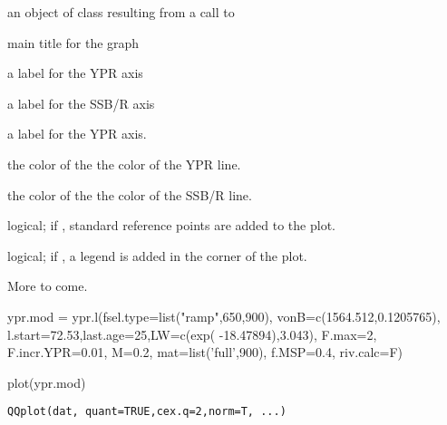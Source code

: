 \documentclass[a4paper]{book}
\begin{document}
\begin{Arguments}
\begin{ldescription}
\item[\code{object}] an object of class  resulting from a
call to 

\item[\code{main}] main title for the graph

\item[\code{ylab.ypr}] a label for the YPR  axis

\item[\code{ylab.ssb}] a label for the SSB/R  axis

\item[\code{xlab}] a label for the YPR  axis.

\item[\code{col.ypr}] the color of the the color of the YPR line.

\item[\code{col.ssb}] the color of the the color of the SSB/R line.

\item[\code{ref}] logical; if , standard reference points are added to the plot.

\item[\code{legend}] logical; if , a legend is added in the  corner of the plot.

\end{ldescription}
\end{Arguments}
%
\begin{Details}\relax
More to come.
\end{Details}
%
\begin{SeeAlso}\relax
{}
\end{SeeAlso}
%
\begin{Examples}
\begin{ExampleCode}
ypr.mod = ypr.l(fsel.type=list("ramp",650,900), vonB=c(1564.512,0.1205765), 
                l.start=72.53,last.age=25,LW=c(exp( -18.47894),3.043), F.max=2,
                F.incr.YPR=0.01, M=0.2, mat=list('full',900), f.MSP=0.4, riv.calc=F)  

plot(ypr.mod)

\end{ExampleCode}
\end{Examples}
\newpage
{}
%
\begin{Usage}
\begin{verbatim}
QQplot(dat, quant=TRUE,cex.q=2,norm=T, ...)
\end{verbatim}
\end{Usage}
\end{document}
